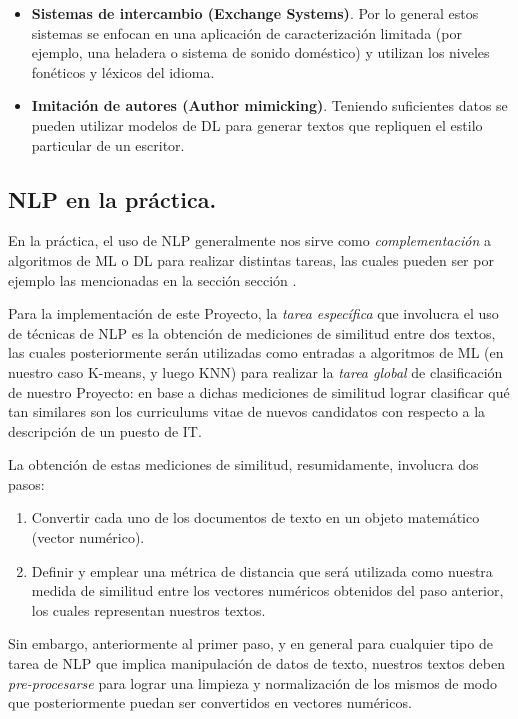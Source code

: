 \documentclass[12pt,a4paper]{article}
\begin{document}
\begin{sloppypar}
\begin{itemize}
\item \textbf{Sistemas de intercambio (Exchange Systems)}. Por lo general estos sistemas se enfocan en una aplicación de caracterización limitada (por ejemplo, una heladera o sistema de sonido doméstico) y utilizan los niveles fonéticos y léxicos del idioma. 

\item \textbf{Imitación de autores (Author mimicking)}. Teniendo suficientes datos se pueden utilizar modelos de DL para generar textos que repliquen el estilo particular de un escritor.
\end{itemize}

\cleardoublepage

\subsection{NLP en la práctica.}\label{Practica_NLP}

En la práctica, el uso de NLP generalmente nos sirve como \textit{complementación} a algoritmos de ML o DL para realizar distintas tareas, las cuales pueden ser por ejemplo las mencionadas en la sección sección \textit{}.

Para la implementación de este Proyecto, la \textit{tarea específica} que involucra el uso de técnicas de NLP es la obtención de mediciones de similitud entre dos textos, las cuales posteriormente serán utilizadas como entradas a algoritmos de ML (en nuestro caso K-means, y luego KNN) para realizar la \textit{tarea global} de clasificación de nuestro Proyecto: en base a dichas mediciones de similitud lograr clasificar qué tan similares son los curriculums vitae de nuevos candidatos con respecto a la descripción de un puesto de IT.

La obtención de estas mediciones de similitud, resumidamente, involucra dos pasos\cite{Similarity_calculation}:
\begin{enumerate}
\item Convertir cada uno de los documentos de texto en un objeto matemático (vector numérico).
\item Definir y emplear una métrica de distancia que será utilizada como nuestra medida de similitud entre los vectores numéricos obtenidos del paso anterior, los cuales representan nuestros textos.
\end{enumerate}

Sin embargo, anteriormente al primer paso, y en general para cualquier tipo de tarea de NLP que implica manipulación de datos de texto, nuestros textos deben \textit{pre-procesarse} para lograr una limpieza y normalización de los mismos de modo que posteriormente puedan ser convertidos en vectores numéricos\cite{NLP_2}.


\end{sloppypar}
\end{document}
